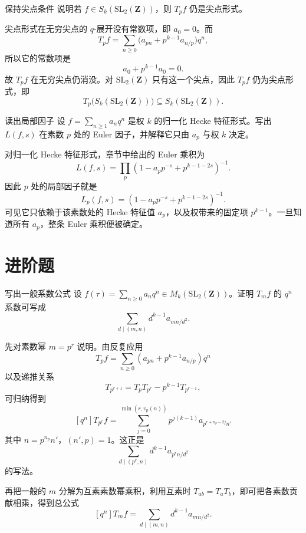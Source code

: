 \begin{problem}{保持尖点条件}
\easy
说明若 $f\in S_k(\mathrm{SL}_2(\mathbf Z))$，则 $T_pf$ 仍是尖点形式。
\end{problem}
\begin{solution}
尖点形式在无穷尖点的 $q$-展开没有常数项，即 $a_0=0$。而
\[
T_pf=\sum_{n\ge0}\bigl(a_{pn}+p^{k-1}a_{n/p}\bigr)q^n,
\]
所以它的常数项是
\[
a_0+p^{k-1}a_0=0.
\]
故 $T_pf$ 在无穷尖点仍消没。对 $\mathrm{SL}_2(\mathbf Z)$ 只有这一个尖点，因此 $T_pf$ 仍为尖点形式，即
\[
T_p\bigl(S_k(\mathrm{SL}_2(\mathbf Z))\bigr)\subseteq S_k(\mathrm{SL}_2(\mathbf Z)).
\]
\end{solution}

\begin{problem}{读出局部因子}
\easy
设 $f=\sum_{n\ge1}a_nq^n$ 是权 $k$ 的归一化 Hecke 特征形式。写出 $L(f,s)$ 在素数 $p$ 处的 Euler 因子，并解释它只由 $a_p$ 与权 $k$ 决定。
\end{problem}
\begin{solution}
对归一化 Hecke 特征形式，章节中给出的 Euler 乘积为
\[
L(f,s)=\prod_p\left(1-a_pp^{-s}+p^{k-1-2s}\right)^{-1}.
\]
因此 $p$ 处的局部因子就是
\[
L_p(f,s)=\left(1-a_pp^{-s}+p^{k-1-2s}\right)^{-1}.
\]
可见它只依赖于该素数处的 Hecke 特征值 $a_p$，以及权带来的固定项 $p^{k-1}$。一旦知道所有 $a_p$，整条 Euler 乘积便被确定。
\end{solution}

\section{进阶题 \medium}

\begin{problem}{写出一般系数公式}
\medium
设 $f(\tau)=\sum_{n\ge0}a_nq^n\in M_k(\mathrm{SL}_2(\mathbf Z))$。证明 $T_mf$ 的 $q^n$ 系数可写成
\[
\sum_{d\mid (m,n)} d^{k-1}a_{mn/d^2}.
\]
\end{problem}
\begin{solution}
先对素数幂 $m=p^r$ 说明。由反复应用
\[
T_pf=\sum_{n\ge0}(a_{pn}+p^{k-1}a_{n/p})q^n
\]
以及递推关系
\[
T_{p^{r+1}}=T_pT_{p^r}-p^{k-1}T_{p^{r-1}},
\]
可归纳得到
\[
[q^n]T_{p^r}f=\sum_{j=0}^{\min(r,v_p(n))}p^{j(k-1)}a_{p^{r+n_p-2j}n'}
\]
其中 $n=p^{n_p}n'$，$(n',p)=1$。这正是
\[
\sum_{d\mid (p^r,n)} d^{k-1}a_{p^rn/d^2}
\]
的写法。

再把一般的 $m$ 分解为互素素数幂乘积，利用互素时 $T_{ab}=T_aT_b$，即可把各素数贡献相乘，得到总公式
\[
[q^n]T_mf=\sum_{d\mid (m,n)} d^{k-1}a_{mn/d^2}.
\]
\end{solution}

